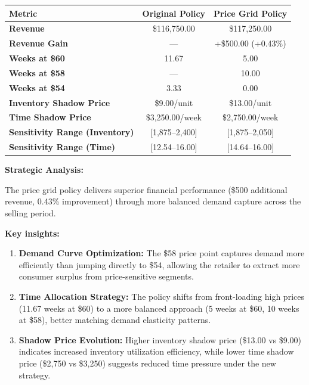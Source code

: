 \documentclass[12pt]{article}
\begin{document}
\begin{enumerate}[label= (\alph*), leftmargin=2em]
\begin{tcolorbox}[colback=white, colframe=gray, title=Policy Comparison: Original vs Price Grid Strategy]
\begin{center}
\begin{tabular}{lcc}
\toprule
\textbf{Metric} & \textbf{Original Policy} & \textbf{Price Grid Policy} \\
\midrule
\textbf{Revenue} & \$116,750.00 & \$117,250.00 \\
\textbf{Revenue Gain} & --- & +\$500.00 (+0.43\%) \\
\midrule
\textbf{Weeks at \$60} & 11.67 & 5.00 \\
\textbf{Weeks at \$58} & --- & 10.00 \\
\textbf{Weeks at \$54} & 3.33 & 0.00 \\
\midrule
\textbf{Inventory Shadow Price} & \$9.00/unit & \$13.00/unit \\
\textbf{Time Shadow Price} & \$3,250.00/week & \$2,750.00/week \\
\textbf{Sensitivity Range (Inventory)} & [1,875--2,400] & [1,875--2,050] \\
\textbf{Sensitivity Range (Time)} & [12.54--16.00] & [14.64--16.00] \\
\bottomrule
\end{tabular}
\end{center}
\end{tcolorbox}

\textbf{Strategic Analysis:}

The price grid policy delivers superior financial performance (\$500 additional revenue, 0.43\% improvement) through more balanced demand capture across the selling period. 

\textbf{Key insights:}

\begin{enumerate}[nosep]
\item \textbf{Demand Curve Optimization:} The \$58 price point captures demand more efficiently than jumping directly to \$54, allowing the retailer to extract more consumer surplus from price-sensitive segments.

\item \textbf{Time Allocation Strategy:} The policy shifts from front-loading high prices (11.67 weeks at \$60) to a more balanced approach (5 weeks at \$60, 10 weeks at \$58), better matching demand elasticity patterns.

\item \textbf{Shadow Price Evolution:} Higher inventory shadow price (\$13.00 vs \$9.00) indicates increased inventory utilization efficiency, while lower time shadow price (\$2,750 vs \$3,250) suggests reduced time pressure under the new strategy.


\end{enumerate}
\end{enumerate}
\end{document}
